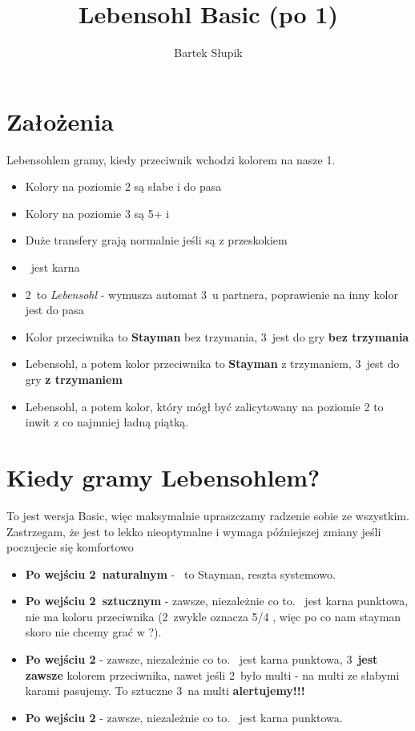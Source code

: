 \documentclass[12pt, a4paper]{article}
\title{Lebensohl Basic (po 1\nt)}
\author{Bartek Słupik}
\begin{document}
    \section{Założenia}
    Lebensohlem gramy, kiedy przeciwnik wchodzi kolorem na nasze 1\nt.
    \begin{itemize}
        \item Kolory na poziomie 2 są słabe i do pasa
        \item Kolory na poziomie 3 są 5+ i \gf
        \item Duże transfery grają normalnie jeśli są z przeskokiem \br
        \item \dbl\ jest karna
        \item 2\nt\ to \emph{Lebensohl} - wymusza automat 3\clubs\ u partnera,
        poprawienie na inny kolor jest do pasa \br
        \item Kolor przeciwnika to \textbf{Stayman} bez trzymania, 3\nt\ jest do gry \textbf{bez trzymania}
        \item Lebensohl, a potem kolor przeciwnika to \textbf{Stayman} z trzymaniem, 3\nt\ jest do gry \textbf{z trzymaniem}
        \item Lebensohl, a potem kolor, który mógł być zalicytowany na poziomie 2 to inwit z co najmniej ładną piątką.
    \end{itemize}

    \section{Kiedy gramy Lebensohlem?}
    To jest wersja Basic, więc maksymalnie upraszczamy radzenie sobie ze wszystkim.
    Zastrzegam, że jest to lekko nieoptymalne i wymaga późniejszej zmiany jeśli poczujecie się komfortowo
    \begin{itemize}
        \item \textbf{Po wejściu 2\clubs\ naturalnym} - \dbl\ to Stayman, reszta systemowo. 
        \item \textbf{Po wejściu 2\clubs\ sztucznym} - zawsze, niezależnie co to. \dbl\ jest karna punktowa, nie ma koloru przeciwnika 
        (2\clubs\ zwykle oznacza 5/4 \major, więc po co nam stayman skoro nie chcemy grać w \major?).
        \item \textbf{Po wejściu 2\diams} - zawsze, niezależnie co to. \dbl\ jest karna punktowa, 3\diams\
        \textbf{jest zawsze} kolorem przeciwnika, nawet jeśli 2\diams\ było multi - na multi ze słabymi karami pasujemy.
        To sztuczne 3\diams\ na multi \textbf{alertujemy!!!}
        \item \textbf{Po wejściu 2\major} - zawsze, niezależnie co to. \dbl\ jest karna punktowa.
    \end{itemize}
\end{document}
